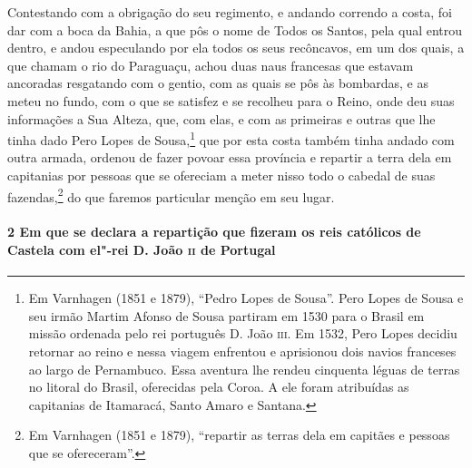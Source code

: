 Contestando com a obrigação do seu regimento, e andando correndo a costa, foi dar com a
boca da Bahia, a que pôs o nome de Todos os Santos, pela qual entrou dentro, e andou
especulando por ela todos os seus recôncavos, em um dos quais, a que chamam o rio do
Paraguaçu, achou duas naus francesas que estavam ancoradas resgatando com o gentio, com as
quais se pôs às bombardas, e as meteu no fundo, com o que se satisfez e se recolheu para o
Reino, onde deu suas informações a Sua Alteza, que, com elas, e com as primeiras e outras
que lhe tinha dado Pero Lopes de Sousa,\footnote{ Em Varnhagen (1851 e 1879), ``Pedro
Lopes de Sousa''. Pero Lopes de Sousa e seu irmão Martim Afonso de Sousa partiram em 1530
para o Brasil em missão ordenada pelo rei português D. João \textsc{iii}. Em 1532, Pero
Lopes decidiu retornar ao reino e nessa viagem enfrentou e aprisionou dois navios
franceses ao largo de Pernambuco. Essa aventura lhe rendeu cinquenta léguas de terras no
litoral do Brasil, oferecidas pela Coroa. A ele foram atribuídas as capitanias de
Itamaracá, Santo Amaro e Santana.} que por esta costa também tinha andado com outra
armada, ordenou de fazer povoar essa província e repartir a terra dela em capitanias por
pessoas que se ofereciam a meter nisso todo o cabedal de suas fazendas,\footnote{ Em
Varnhagen (1851 e 1879), ``repartir as terras dela em capitães e pessoas que se
ofereceram''.} do que faremos particular menção em seu lugar.

\paragraph{2 Em que se declara a repartição que fizeram os reis católicos de Castela com
el"-rei D. João \textsc{ii} de Portugal}


